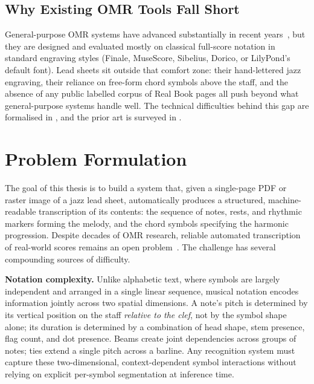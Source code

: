 \subsection{Why Existing OMR Tools Fall Short}

General-purpose OMR systems have advanced substantially in recent
years~\cite{shatriOPTICALMUSICRECOGNITION}, but they are designed and evaluated mostly on
classical full-score notation in standard engraving styles (Finale, MuseScore, Sibelius, Dorico, or
LilyPond's default font). Lead sheets sit outside that comfort zone: their hand-lettered
jazz engraving, their reliance on free-form chord symbols above the staff, and the absence
of any public labelled corpus of Real Book pages all push beyond what general-purpose
systems handle well. The technical difficulties behind this gap are formalised in
, and the prior art is surveyed in .

\section{Problem Formulation}
\label{sec:problem-formulation}

The goal of this thesis is to build a system that, given a single-page PDF or raster
image of a jazz lead sheet, automatically produces a structured, machine-readable
transcription of its contents: the sequence of notes, rests, and rhythmic markers
forming the melody, and the chord symbols specifying the harmonic progression. Despite
decades of OMR research, reliable automated transcription of real-world scores remains
an open problem~\cite{shatriOPTICALMUSICRECOGNITION}. The challenge has several
compounding sources of difficulty.

\textbf{Notation complexity.}
Unlike alphabetic text, where symbols are largely independent and arranged in a single
linear sequence, musical notation encodes information jointly across two spatial
dimensions. A note's pitch is determined by its vertical position on the staff
\textit{relative to the clef}, not by the symbol shape alone; its duration is determined
by a combination of head shape, stem presence, flag count, and dot presence. Beams
create joint dependencies across groups of notes; ties extend a single pitch across a
barline. Any recognition system must capture these two-dimensional, context-dependent
symbol interactions without relying on explicit per-symbol segmentation at inference
time.

